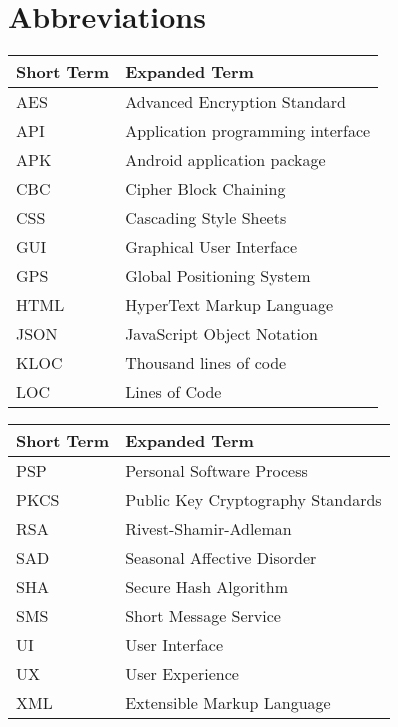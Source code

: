 \chapter{Abbreviations}

\begin{tabular}{p{40mm}|p{100mm}}
	\textbf{Short Term}&\textbf{Expanded Term}\\
	\hline
	
	AES		& Advanced Encryption Standard\\	
	API		& Application programming interface\\
	APK		& Android application package\\
	
	CBC 		& Cipher Block Chaining\\	
	CSS 		& Cascading Style Sheets\\
	
	GUI		& Graphical User Interface\\
	GPS		& Global Positioning System\\
	
	HTML 	& HyperText Markup Language\\
	
	JSON 	& JavaScript Object Notation\\
	
	KLOC	&	Thousand lines of code\\
	
	LOC		&	Lines of Code\\

\end{tabular}

\begin{tabular}{p{40mm}|p{100mm}}
	\textbf{Short Term}&\textbf{Expanded Term}\\
	\hline

	PSP		& 	Personal Software Process\\	
	
	PKCS 	& Public Key Cryptography Standards\\
	RSA		& Rivest-Shamir-Adleman\\
	
	SAD 		& Seasonal Affective Disorder\\
	SHA 		& Secure Hash Algorithm\\
	SMS 		& Short Message Service\\
	
	UI			& User Interface\\
	UX 		& User Experience\\	
	
	XML		& Extensible Markup Language\\

\end{tabular}